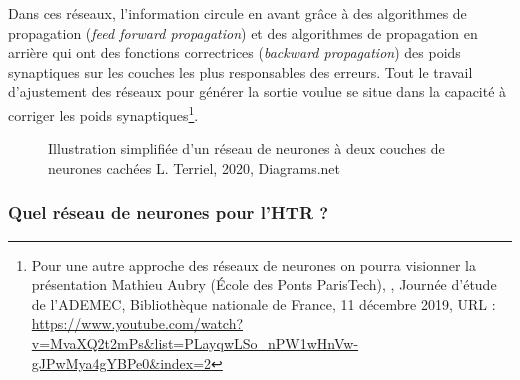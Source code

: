 Dans ces réseaux, l'information circule en avant grâce à des algorithmes de propagation (\textit{feed forward propagation}) et des algorithmes de propagation en arrière qui ont des fonctions correctrices (\textit{backward propagation}) des poids synaptiques sur les couches les plus responsables des erreurs. Tout le travail d'ajustement des réseaux pour générer la sortie voulue se situe dans la capacité à corriger les poids synaptiques\footnote{Pour une autre approche des réseaux de neurones on pourra visionner la présentation Mathieu Aubry (École des Ponts ParisTech), , Journée d'étude  de l'ADEMEC, Bibliothèque nationale de France, 11 décembre 2019, URL : \url{https://www.youtube.com/watch?v=MvaXQ2t2mPs&list=PLayqwLSo_nPW1wHnVw-gJPwMya4gYBPe0&index=2}}.

\newpage
\begin{figure}[h]
    \centering
    \centerline{}
    \caption{Illustration simplifiée d'un réseau de neurones à deux couches de neurones cachées   \textcopyright L. Terriel, 2020, Diagrams.net}
    \label{fig:graph_neurones_artificiels}
\end{figure}

\subsubsection{Quel réseau de neurones pour l'HTR ?}     

